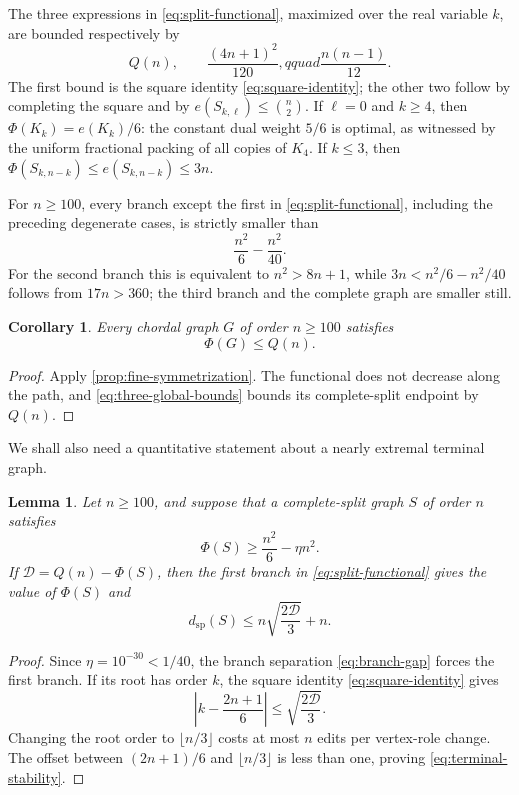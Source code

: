 \documentclass[11pt,reqno]{amsart}
\numberwithin{equation}{section}
\newtheorem{lemma}[theorem]{Lemma}
\newtheorem{corollary}[theorem]{Corollary}
\theoremstyle{definition}
\theoremstyle{remark}
\newcommand{\PhiF}{\Phi}
\newcommand{\distsp}{d_{\mathrm{sp}}}
\begin{document}
The three expressions in \eqref{eq:split-functional}, maximized over the real
variable $k$, are bounded respectively by
\begin{equation}\label{eq:three-global-bounds}
  Q(n),\qquad \frac{(4n+1)^2}{120},qquad
  \frac{n(n-1)}{12}.
\end{equation}
The first bound is the square identity \eqref{eq:square-identity}; the other
two follow by completing the square and by $e(S_{k,\ell})\leq\binom n2$.
If $\ell=0$ and $k\geq4$, then
$\PhiF(K_k)=e(K_k)/6$: the constant dual weight $5/6$ is optimal, as witnessed
by the uniform fractional packing of all copies of $K_4$.  If $k\leq3$, then
$\PhiF(S_{k,n-k})\leq e(S_{k,n-k})\leq3n$.

For $n\geq100$, every branch except the first in
\eqref{eq:split-functional}, including the preceding degenerate cases, is
strictly smaller than
\begin{equation}\label{eq:branch-gap}
  \frac{n^2}{6}-\frac{n^2}{40}.
\end{equation}
For the second branch this is equivalent to $n^2>8n+1$, while
$3n<n^2/6-n^2/40$ follows from $17n>360$; the third branch and the complete
graph are smaller still.

\begin{corollary}\label{cor:global-Phi-bound}
Every chordal graph $G$ of order $n\geq100$ satisfies
\[
  \PhiF(G)\leq Q(n).
\]
\end{corollary}

\begin{proof}
Apply \cref{prop:fine-symmetrization}.  The functional does not decrease along
the path, and \eqref{eq:three-global-bounds} bounds its complete-split
endpoint by $Q(n)$.
\end{proof}

We shall also need a quantitative statement about a nearly extremal terminal
graph.

\begin{lemma}\label{lem:terminal-stability}
Let $n\geq100$, and suppose that a complete-split graph $S$ of order $n$
satisfies
\[
  \PhiF(S)\geq\frac{n^2}{6}-\eta n^2.
\]
If $\mathcal{D}=Q(n)-\PhiF(S)$, then the first branch in
\eqref{eq:split-functional} gives the value of $\PhiF(S)$ and
\begin{equation}\label{eq:terminal-stability}
  \distsp(S)\leq n\sqrt{\frac{2\mathcal{D}}3}+n.
\end{equation}
\end{lemma}

\begin{proof}
Since $\eta=10^{-30}<1/40$, the branch separation
\eqref{eq:branch-gap} forces the first branch.  If its root has order $k$,
the square identity \eqref{eq:square-identity} gives
\[
  \left|k-\frac{2n+1}{6}\right|
  \leq\sqrt{\frac{2\mathcal{D}}3}.
\]
Changing the root order to $\lfloor n/3\rfloor$ costs at most $n$ edits per
vertex-role change.  The offset between $(2n+1)/6$ and $\lfloor n/3\rfloor$
is less than one, proving \eqref{eq:terminal-stability}.
\end{proof}
\end{document}
